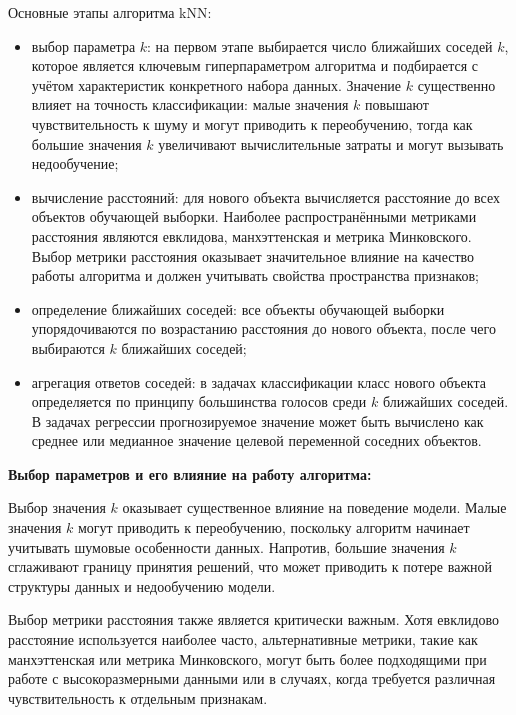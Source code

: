 Основные этапы алгоритма kNN:
\begin{itemize}[label=---, itemsep=0pt, parsep=0pt, topsep=0pt]
	\item выбор параметра $k$: на первом этапе выбирается число ближайших соседей $k$, которое является ключевым гиперпараметром алгоритма и подбирается с учётом характеристик конкретного набора данных. Значение $k$ существенно влияет на точность классификации: малые значения $k$ повышают чувствительность к шуму и могут приводить к переобучению, тогда как большие значения $k$ увеличивают вычислительные затраты и могут вызывать недообучение;
	\item вычисление расстояний: для нового объекта вычисляется расстояние до всех объектов обучающей выборки. Наиболее распространёнными метриками расстояния являются евклидова, манхэттенская и метрика Минковского. Выбор метрики расстояния оказывает значительное влияние на качество работы алгоритма и должен учитывать свойства пространства признаков;
	\item определение ближайших соседей: все объекты обучающей выборки упорядочиваются по возрастанию расстояния до нового объекта, после чего выбираются $k$ ближайших соседей;
	\item агрегация ответов соседей: в задачах классификации класс нового объекта определяется по принципу большинства голосов среди $k$ ближайших соседей. В задачах регрессии прогнозируемое значение может быть вычислено как среднее или медианное значение целевой переменной соседних объектов.
\end{itemize}

\textbf{Выбор параметров и его влияние на работу алгоритма:}


Выбор значения $k$ оказывает существенное влияние на поведение модели. Малые значения $k$ могут приводить к переобучению, поскольку алгоритм начинает учитывать шумовые особенности данных. Напротив, большие значения $k$ сглаживают границу принятия решений, что может приводить к потере важной структуры данных и недообучению модели.

Выбор метрики расстояния также является критически важным. Хотя евклидово расстояние используется наиболее часто, альтернативные метрики, такие как манхэттенская или метрика Минковского, могут быть более подходящими при работе с высокоразмерными данными или в случаях, когда требуется различная чувствительность к отдельным признакам.

